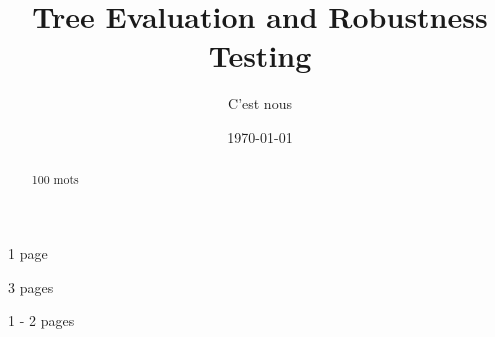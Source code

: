 \documentclass[a4paper,12pt]{article}
\title{Tree Evaluation and Robustness Testing}
\author{C'est nous}
\begin{document}

\date{\today}
\maketitle

\begin{abstract}
100 mots
\end{abstract}

\tableofcontents



 1 page %



 3 pages %

% 

 1 - 2 pages %




\end{document}
